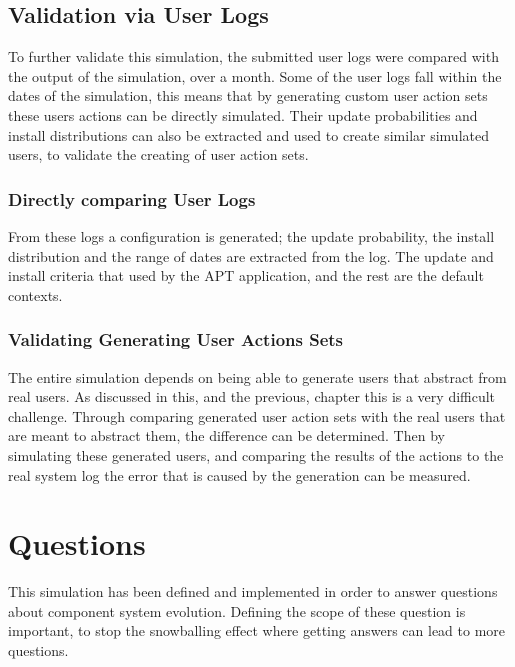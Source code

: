 
\subsection{Validation via User Logs}
To further validate this simulation, the submitted user logs were compared with the output of the simulation, over a month.
Some of the user logs fall within the dates of the simulation, this means that by generating custom user action sets these users actions can be directly simulated.
Their update probabilities and install distributions can also be extracted and used to create similar simulated users, to validate the creating of user action sets.

\subsubsection{Directly comparing User Logs}
From these logs a configuration is generated; the update probability, the install distribution and the range of dates are extracted from the log.
The update and install criteria that used by the APT application, and the rest are the default contexts.  


\subsubsection{Validating Generating User Actions Sets}
The entire simulation depends on being able to generate users that abstract from real users.
As discussed in this, and the previous, chapter this is a very difficult challenge.
Through comparing generated user action sets with the real users that are meant to abstract them, the difference can be determined.
Then by simulating these generated users, and comparing the results of the actions to the real system log the error that is caused by the generation can be measured.  




\section{Questions}
This simulation has been defined and implemented in order to answer questions about component system evolution.
Defining the scope of these question is important, to stop the snowballing effect where getting answers can lead to more questions. 

